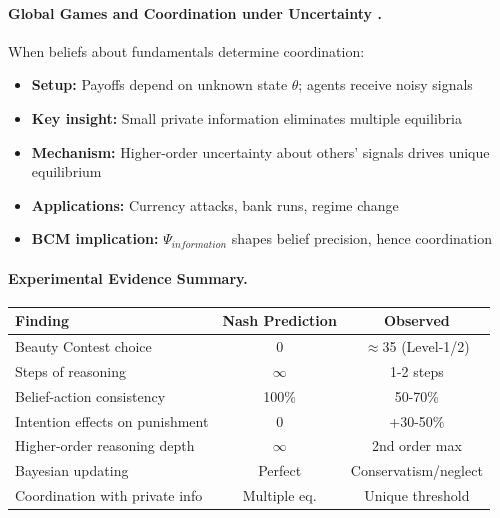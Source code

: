 \paragraph{Global Games and Coordination under Uncertainty \citep{carlsson1993global, morris2003global}.}
When beliefs about fundamentals determine coordination:
\begin{itemize}[nosep]
    \item \textbf{Setup:} Payoffs depend on unknown state $\theta$; agents receive noisy signals
    \item \textbf{Key insight:} Small private information eliminates multiple equilibria
    \item \textbf{Mechanism:} Higher-order uncertainty about others' signals drives unique equilibrium
    \item \textbf{Applications:} Currency attacks, bank runs, regime change
    \item \textbf{BCM implication:} $\Psi_{information}$ shapes belief precision, hence coordination
\end{itemize}

\paragraph{Experimental Evidence Summary.}
\begin{center}
\small
\begin{tabular}{@{}lcc@{}}
\toprule
\textbf{Finding} & \textbf{Nash Prediction} & \textbf{Observed} \\
\midrule
Beauty Contest choice & 0 & $\approx$35 (Level-1/2) \\
Steps of reasoning & $\infty$ & 1-2 steps \\
Belief-action consistency & 100\% & 50-70\% \\
Intention effects on punishment & 0 & +30-50\% \\
Higher-order reasoning depth & $\infty$ & 2nd order max \\
Bayesian updating & Perfect & Conservatism/neglect \\
Coordination with private info & Multiple eq. & Unique threshold \\
\bottomrule
\end{tabular}
\end{center}


